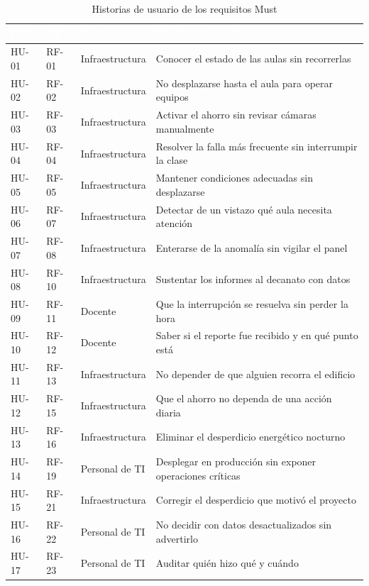 \begin{table}[H]
\centering
\small
\begin{tabular}{|l|l|p{2.9cm}|p{6.2cm}|}
\hline
\cellcolor{sigagreen}\textcolor{white}{\textbf{HU}} & \cellcolor{sigagreen}\textcolor{white}{\textbf{RF}} & \cellcolor{sigagreen}\textcolor{white}{\textbf{Rol}} & \cellcolor{sigagreen}\textcolor{white}{\textbf{Beneficio buscado}} \\ \hline
HU-01 & RF-01 & Infraestructura & Conocer el estado de las aulas sin recorrerlas \\ \hline
HU-02 & RF-02 & Infraestructura & No desplazarse hasta el aula para operar equipos \\ \hline
HU-03 & RF-03 & Infraestructura & Activar el ahorro sin revisar c\'amaras manualmente \\ \hline
HU-04 & RF-04 & Infraestructura & Resolver la falla m\'as frecuente sin interrumpir la clase \\ \hline
HU-05 & RF-05 & Infraestructura & Mantener condiciones adecuadas sin desplazarse \\ \hline
HU-06 & RF-07 & Infraestructura & Detectar de un vistazo qu\'e aula necesita atenci\'on \\ \hline
HU-07 & RF-08 & Infraestructura & Enterarse de la anomal\'ia sin vigilar el panel \\ \hline
HU-08 & RF-10 & Infraestructura & Sustentar los informes al decanato con datos \\ \hline
HU-09 & RF-11 & Docente & Que la interrupci\'on se resuelva sin perder la hora \\ \hline
HU-10 & RF-12 & Docente & Saber si el reporte fue recibido y en qu\'e punto est\'a \\ \hline
HU-11 & RF-13 & Infraestructura & No depender de que alguien recorra el edificio \\ \hline
HU-12 & RF-15 & Infraestructura & Que el ahorro no dependa de una acci\'on diaria \\ \hline
HU-13 & RF-16 & Infraestructura & Eliminar el desperdicio energ\'etico nocturno \\ \hline
HU-14 & RF-19 & Personal de TI & Desplegar en producci\'on sin exponer operaciones cr\'iticas \\ \hline
HU-15 & RF-21 & Infraestructura & Corregir el desperdicio que motiv\'o el proyecto \\ \hline
HU-16 & RF-22 & Personal de TI & No decidir con datos desactualizados sin advertirlo \\ \hline
HU-17 & RF-23 & Personal de TI & Auditar qui\'en hizo qu\'e y cu\'ando \\ \hline
\end{tabular}
\caption{Historias de usuario de los requisitos Must}
\label{tab:historias}
\end{table}


